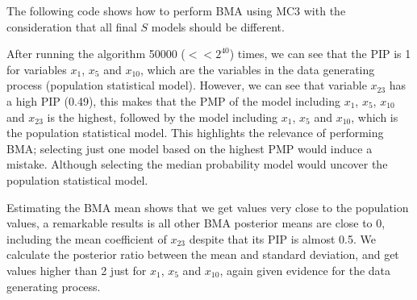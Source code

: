 \begin{enumerate}[leftmargin=*]
The following code shows how to perform BMA using MC3 with the consideration that all final $S$ models should be different.

After running the algorithm 50000 ($<<2^{40}$) times, we can see that the PIP is 1 for variables $x_1$, $x_5$ and $x_{10}$, which are the variables in the data generating process (population statistical model). However, we can see that variable $x_{23}$ has a high PIP (0.49), this makes that the PMP of the model including $x_1$, $x_5$, $x_{10}$ and $x_{23}$ is the highest, followed by the model including $x_1$, $x_5$ and $x_{10}$, which is the population statistical model. This highlights the relevance of performing BMA; selecting just one model based on the highest PMP would induce a mistake. Although selecting the median probability model would uncover the population statistical model. 

Estimating the BMA mean shows that we get values very close to the population values, a remarkable results is all other BMA posterior means are close to 0, including the mean coefficient of $x_{23}$ despite that its PIP is almost 0.5. We calculate the posterior ratio between the mean and standard deviation, and get values higher than 2 just for $x_1$, $x_5$ and $x_{10}$, again given evidence for the data generating process.     
	

\end{enumerate}

